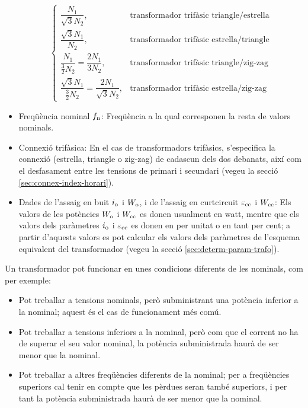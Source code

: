 \begin{itemize}
\begin{equation}
\begin{cases}
        \dfrac{N_1}{\sqrt{3}N_2}, & \text{transformador trifàsic triangle/estrella} \\[0.4cm]
        \dfrac{\sqrt{3}N_1}{N_2}, & \text{transformador trifàsic estrella/triangle} \\[0.4cm]
        \dfrac{N_1}{\frac{3}{2}N_2} = \dfrac{2 N_1}{3 N_2}, & \text{transformador trifàsic triangle/zig-zag} \\[0.4cm]
        \dfrac{\sqrt{3}N_1}{\frac{3}{2}N_2} = \dfrac{2 N_1}{\sqrt{3} N_2}, & \text{transformador trifàsic estrella/zig-zag}
         \end{cases}
       \end{equation}
   \item Freqüència nominal $f_\mathrm{n}$: Freqüència a la qual corresponen la resta de valors nominals.
   \item Connexió trifàsica: En el cas de transformadors trifàsics, s'especifica la connexió (estrella, triangle o zig-zag) de cadascun dels dos debanats, així com el desfasament entre les tensions de primari i secundari (vegeu la secció \vref{sec:connex-index-horari}).
   \item Dades de l'assaig en buit $i_\mathrm{o}$ i $W_\mathrm{o}$, i de l'assaig en curtcircuit $\varepsilon_\mathrm{cc}$ i $W_\mathrm{cc}$: Els valors de les potències $W_\mathrm{o}$ i $W_\mathrm{cc}$ es donen
usualment en watt, mentre que els valors dels paràmetres $i_\mathrm{o}$
i $\varepsilon_\mathrm{cc}$ es donen en per unitat o en tant per cent; a partir d'aquests valors es pot calcular els valors dels paràmetres de l'esquema equivalent del transformador  (vegeu la secció \vref{sec:determ-param-trafo}).
\end{itemize}

Un transformador pot funcionar en unes condicions diferents de les nominals, com per exemple:
\begin{itemize}
   \item Pot treballar a tensions nominals, però subministrant una potència inferior a la nominal; aquest és el cas de funcionament més comú.
   \item Pot treballar a tensions inferiors a la nominal, però com que el corrent no ha de superar el seu valor nominal, la potència subministrada haurà de ser menor que la nominal.
   \item Pot treballar a altres freqüències diferents de la nominal; per a freqüències superiors cal tenir en compte que les pèrdues seran també superiors, i per tant la potència subministrada haurà de ser menor que la nominal.
\end{itemize}

